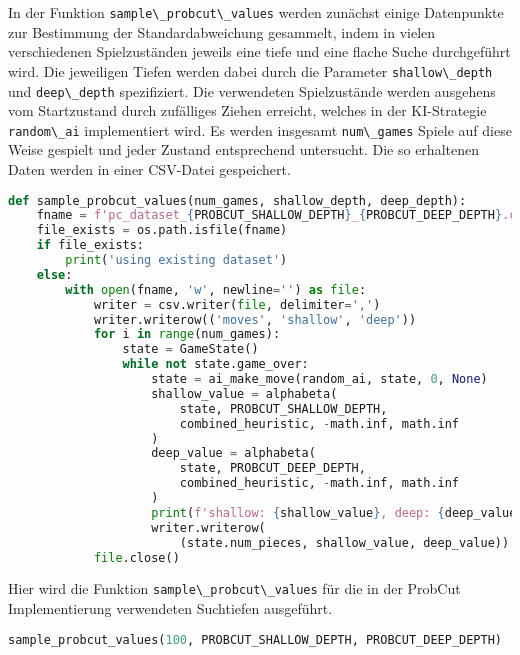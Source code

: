 In der Funktion \passthrough{\lstinline!sample\_probcut\_values!} werden
zunächst einige Datenpunkte zur Bestimmung der Standardabweichung
gesammelt, indem in vielen verschiedenen Spielzuständen jeweils eine
tiefe und eine flache Suche durchgeführt wird. Die jeweiligen Tiefen
werden dabei durch die Parameter
\passthrough{\lstinline!shallow\_depth!} und
\passthrough{\lstinline!deep\_depth!} spezifiziert. Die verwendeten
Spielzustände werden ausgehens vom Startzustand durch zufälliges Ziehen
erreicht, welches in der \ac{KI}-Strategie
\passthrough{\lstinline!random\_ai!} implementiert wird. Es werden
insgesamt \passthrough{\lstinline!num\_games!} Spiele auf diese Weise
gespielt und jeder Zustand entsprechend untersucht. Die so erhaltenen
Daten werden in einer CSV-Datei gespeichert.

\begin{lstlisting}[language=Python]
def sample_probcut_values(num_games, shallow_depth, deep_depth):
    fname = f'pc_dataset_{PROBCUT_SHALLOW_DEPTH}_{PROBCUT_DEEP_DEPTH}.csv'
    file_exists = os.path.isfile(fname)
    if file_exists:
        print('using existing dataset')
    else:
        with open(fname, 'w', newline='') as file:
            writer = csv.writer(file, delimiter=',')
            writer.writerow(('moves', 'shallow', 'deep'))
            for i in range(num_games):
                state = GameState()
                while not state.game_over:
                    state = ai_make_move(random_ai, state, 0, None)
                    shallow_value = alphabeta(
                        state, PROBCUT_SHALLOW_DEPTH,
                        combined_heuristic, -math.inf, math.inf
                    )
                    deep_value = alphabeta(
                        state, PROBCUT_DEEP_DEPTH,
                        combined_heuristic, -math.inf, math.inf
                    )
                    print(f'shallow: {shallow_value}, deep: {deep_value}')
                    writer.writerow(
                        (state.num_pieces, shallow_value, deep_value))
            file.close()
\end{lstlisting}

Hier wird die Funktion \passthrough{\lstinline!sample\_probcut\_values!}
für die in der ProbCut Implementierung verwendeten Suchtiefen
ausgeführt.

\begin{lstlisting}[language=Python]
sample_probcut_values(100, PROBCUT_SHALLOW_DEPTH, PROBCUT_DEEP_DEPTH)
\end{lstlisting}

